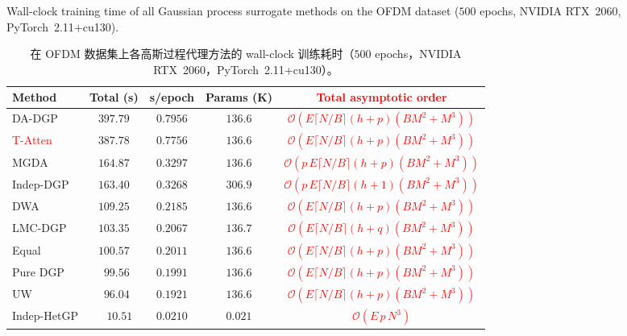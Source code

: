 \documentclass[11pt]{article}
\begin{document}
		\begin{table}[!h]
			\centering
			\footnotesize
			\setlength{\tabcolsep}{2.5pt}
			\caption{Wall-clock training time of all Gaussian process surrogate methods on the OFDM dataset ($500$ epochs, NVIDIA RTX~2060, PyTorch~2.11+cu130).}
		\caption*{在 OFDM 数据集上各高斯过程代理方法的 wall-clock 训练耗时（$500$ epochs，NVIDIA RTX~2060，PyTorch~2.11+cu130）。}
		\label{tab:training_time_appendix}
		\begin{tabular*}{\textwidth}{@{\extracolsep{\fill}}lcccc}
			\toprule
				\textbf{Method} & \textbf{Total (s)} & \textbf{s/epoch} & \textbf{Params (K)} & \textbf{\textcolor{red}{Total asymptotic order}} \\
				\midrule
				DA-DGP            & $397.79$ & $0.7956$ & $136.6$ & \textcolor{red}{$\mathcal{O}(E\lceil N/B\rceil(h+p)(BM^{2}\!+\!M^{3}))$}\\
				\textcolor{red}{T-Atten}    & $387.78$ & $0.7756$ & $136.6$ & \textcolor{red}{$\mathcal{O}(E\lceil N/B\rceil(h+p)(BM^{2}\!+\!M^{3}))$}\\%
				MGDA              & $164.87$ & $0.3297$ & $136.6$ & \textcolor{red}{$\mathcal{O}(p\,E\lceil N/B\rceil(h+p)(BM^{2}\!+\!M^{3}))$}\\
				Indep-DGP         & $163.40$ & $0.3268$ & $306.9$ & \textcolor{red}{$\mathcal{O}(p\,E\lceil N/B\rceil(h+1)(BM^{2}\!+\!M^{3}))$}\\
				DWA               & $109.25$ & $0.2185$ & $136.6$ & \textcolor{red}{$\mathcal{O}(E\lceil N/B\rceil(h+p)(BM^{2}\!+\!M^{3}))$}\\
				LMC-DGP           & $103.35$ & $0.2067$ & $136.7$ & \textcolor{red}{$\mathcal{O}(E\lceil N/B\rceil(h+q)(BM^{2}\!+\!M^{3}))$}\\
				Equal             & $100.57$ & $0.2011$ & $136.6$ & \textcolor{red}{$\mathcal{O}(E\lceil N/B\rceil(h+p)(BM^{2}\!+\!M^{3}))$}\\
				Pure DGP          & $\phantom{0}99.56$ & $0.1991$ & $136.6$ & \textcolor{red}{$\mathcal{O}(E\lceil N/B\rceil(h+p)(BM^{2}\!+\!M^{3}))$}\\
				UW                & $\phantom{0}96.04$ & $0.1921$ & $136.6$ & \textcolor{red}{$\mathcal{O}(E\lceil N/B\rceil(h+p)(BM^{2}\!+\!M^{3}))$}\\
				Indep-HetGP       & $\phantom{00}10.51$ & $0.0210$ & $0.021$ & \textcolor{red}{$\mathcal{O}(E\,p\,N^{3})$}\\
			\bottomrule
		\end{tabular*}
	\end{table}
\end{document}

